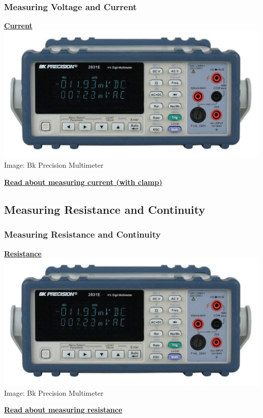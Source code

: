 \documentclass[fleqn]{beamer} %
\newcommand{\sectionIsubsectionIIItitle}{Measuring Voltage and Current}
\newcommand{\sectionIsubsectionIVtitle}{Measuring Resistance and Continuity}
\begin{document}
			\begin{frame} 
				\frametitle{\sectionIsubsectionIIItitle}
				\underline{{\bf Current}} \vspace{10mm}\\  
 
				\includegraphics[scale=.13]{images/bk_2831e.jpg}
				\vspace{10mm}
				\tiny{Image: Bk Precision Multimeter }

				\textbf{ \href{https://www.fluke.com/en-us/learn/best-practices/test-tools-basics/digital-multimeters/how-to-measure-current-with-a-digital-multimeter-plus-clamp-accessory}{Read about measuring current (with clamp)} }

			\end{frame}	

		\subsection{\sectionIsubsectionIVtitle}\label{sectionIsubsectionIV}	

			\begin{frame}
				\frametitle{\sectionIsubsectionIVtitle}
				\underline{{\bf \large Resistance}} \vspace{10mm}\\ 

				\includegraphics[scale=.13]{images/bk_2831e.jpg}
				\vspace{10mm}
				\tiny{Image: Bk Precision Multimeter }

				\textbf{ \href{https://www.fluke.com/en-us/learn/best-practices/test-tools-basics/digital-multimeters/how-to-measure-resistance}{Read about measuring resistance} }

			\end{frame}
\end{document}
